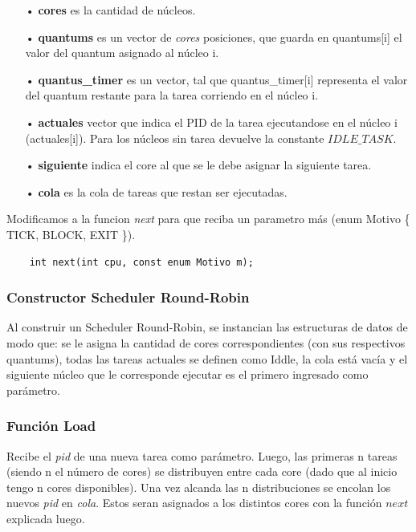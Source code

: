 \documentclass[a4paper]{article}
\begin{document}
	\begin{itemize}
	\item[•]\textbf{cores} es la cantidad de n\'ucleos.
	\item[•]\textbf{quantums} es un vector de \textit{cores} posiciones, que guarda en quantums[i] el valor del quantum asignado al n\'ucleo i.
	\item[•]\textbf{quantus_timer} es un vector, tal que quantus_timer[i] representa el valor del quantum restante para la tarea corriendo en el n\'ucleo i.
	\item[•]\textbf{actuales} vector que indica el PID de la tarea ejecutandose en el núcleo i (actuales[i]). Para los núcleos sin tarea devuelve la constante $IDLE\_TASK$.
	\item[•]\textbf{siguiente} indica el core al que se le debe asignar la siguiente tarea.
	\item[•]\textbf{cola} es la cola de tareas que restan ser ejecutadas.
	\end{itemize}	
	
\noindent  Modificamos a la funcion \emph{next} para que reciba un parametro m\'as (enum Motivo \{ TICK, BLOCK, EXIT \}).
	\begin{codesnippet}
	\begin{verbatim}
    int next(int cpu, const enum Motivo m);
	\end{verbatim}
	\end{codesnippet}
		
\subsubsection*{Constructor Scheduler Round-Robin}		

Al construir un Scheduler Round-Robin, se instancian las estructuras de datos de modo que: se le asigna la cantidad de cores correspondientes (con sus respectivos quantums), todas las tareas actuales se definen como Iddle, la cola est\'a vac\'ia y el siguiente n\'ucleo que le corresponde ejecutar es el primero ingresado como par\'ametro.

\subsubsection*{Funci\'on Load}

Recibe el \emph{pid} de una nueva tarea como par\'ametro. Luego, las primeras n tareas (siendo n el número de cores) se distribuyen entre cada core (dado que al inicio tengo n cores disponibles). Una vez alcanda las n distribuciones se encolan los nuevos \emph{pid} en \emph{cola}. Estos seran asignados a los distintos cores con la función $next$ explicada luego.
\end{document}
